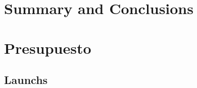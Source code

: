 \documentclass[spanish,a4paper,14pt,oneside]{extreport}
\begin{document}
\newpage{\pagestyle{empty}}
\thispagestyle{empty}

\chapter{Summary and Conclusions }
\label{chapter:summary}



\newpage{\pagestyle{empty}}
\thispagestyle{empty}

\chapter{Presupuesto}
\label{chapter:presupuesto}




\newpage{\pagestyle{empty}}
\thispagestyle{empty}
\begin{appendix}

\chapter{Launchs}
\label{appendix:1}


% 
% 
% 

\end{appendix}




\nocite{*}

\end{document}

